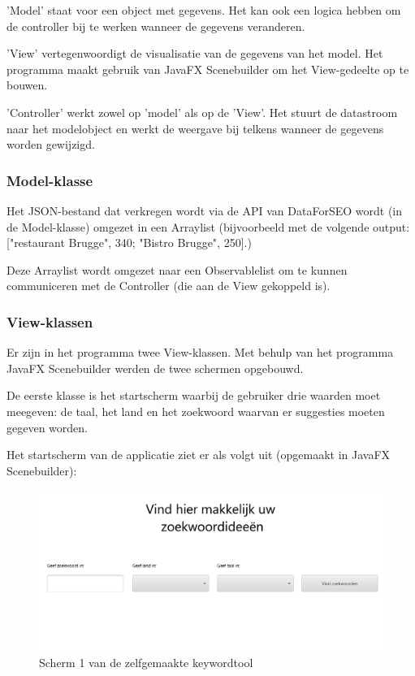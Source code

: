 'Model' staat voor een object met gegevens. Het kan ook een logica hebben om de controller bij te werken wanneer de gegevens veranderen. 

'View' vertegenwoordigt de visualisatie van de gegevens van het model. Het programma maakt gebruik van JavaFX Scenebuilder om het View-gedeelte op te bouwen. 

'Controller' werkt zowel op 'model' als op de 'View'. Het stuurt de datastroom naar het modelobject en werkt de weergave bij telkens wanneer de gegevens worden gewijzigd.

\subsubsection{Model-klasse}
\label{ch: Model-klasse}

Het JSON-bestand dat verkregen wordt via de API van DataForSEO wordt (in de Model-klasse) omgezet in een Arraylist (bijvoorbeeld met de volgende output: ["restaurant Brugge", 340; "Bistro Brugge", 250].)

Deze Arraylist wordt omgezet naar een Observablelist om te kunnen communiceren met de Controller (die aan de View gekoppeld is). 

\subsubsection{View-klassen}
\label{ch: View-klassen}

Er zijn in het programma twee View-klassen. Met behulp van het programma JavaFX Scenebuilder werden de twee schermen opgebouwd.

De eerste klasse is het startscherm waarbij de gebruiker drie waarden moet meegeven: de taal, het land en het zoekwoord waarvan er suggesties moeten gegeven worden. 

Het startscherm van de applicatie ziet er als volgt uit (opgemaakt in JavaFX Scenebuilder): 

\begin{figure}[h!]
\centering
\includegraphics[width=\linewidth]{img/keywordtoolscherm1.PNG}
\caption{Scherm 1 van de zelfgemaakte keywordtool}
\end{figure}

